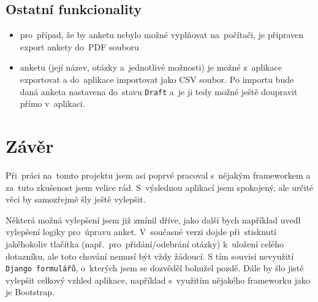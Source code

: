 \documentclass[czech]{pyt-report}
\begin{document}
\subsection{Ostatní funkcionality}
\begin{itemize}
\item pro~případ, že by anketu nebylo možné vyplňovat na~počítači, je připraven export ankety do~PDF souboru
\item anketu (její název, otázky a~jednotlivé možnosti) je možné z~aplikace exportovat a do~aplikace importovat jako CSV soubor. Po importu bude daná anketa nastavena do~stavu \texttt{Draft} a~je ji tedy možné ještě doupravit přímo v~aplikaci.
\end{itemize}

\section{Závěr}

Při~práci na~tomto projektu jsem asi poprvé pracoval s~nějakým frameworkem a za~tuto zkušenost jsem velice rád. S~výslednou aplikací jsem spokojený, ale určité věci by samozřejmě šly ještě vylepšit.

Některá možná vylepšení jsem již zmínil dříve, jako další bych například uvedl vylepšení logiky pro~úpravu anket. V~současné verzi dojde při~stisknutí jakéhokoliv tlačítka (např.~pro~přidání/odebrání otázky) k~uložení celého dotazníku, ale toto chování nemusí být vždy žádoucí. S tím souvisí nevyužití \texttt{Django formulářů}, o~kterých jsem se dozvěděl bohužel pozdě. Dále by šlo jistě vylepšit celkový vzhled aplikace, například s~využitím nějakého frameworku jako je Bootstrap.


%

\end{document}
